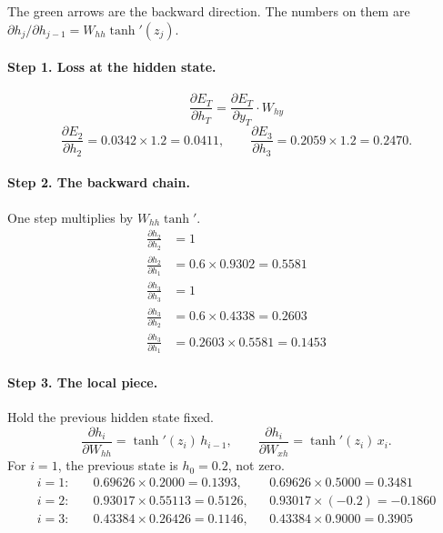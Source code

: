 \documentclass[11pt,a4paper]{article}
\begin{document}
\begin{center}
\end{center}

The green arrows are the backward direction. The numbers on them are \(\partial h_j/\partial h_{j-1}=W_{hh}\tanh'(z_j)\).

\paragraph{Step 1. Loss at the hidden state.}
\[
\frac{\partial E_T}{\partial h_T}=\frac{\partial E_T}{\partial y_T}\cdot W_{hy}
\]
\[
\frac{\partial E_2}{\partial h_2}=0.0342\times 1.2=0.0411,
\qquad
\frac{\partial E_3}{\partial h_3}=0.2059\times 1.2=0.2470.
\]

\paragraph{Step 2. The backward chain.} One step multiplies by \(W_{hh}\tanh'\).
\begin{align*}
\frac{\partial h_2}{\partial h_2}&=1\\
\frac{\partial h_2}{\partial h_1}&=0.6\times 0.9302=0.5581\\[0.3em]
\frac{\partial h_3}{\partial h_3}&=1\\
\frac{\partial h_3}{\partial h_2}&=0.6\times 0.4338=0.2603\\
\frac{\partial h_3}{\partial h_1}&=0.2603\times 0.5581=0.1453
\end{align*}

\paragraph{Step 3. The local piece.} Hold the previous hidden state fixed.
\[
\frac{\partial h_i}{\partial W_{hh}}=\tanh'(z_i)\,h_{i-1},
\qquad
\frac{\partial h_i}{\partial W_{xh}}=\tanh'(z_i)\,x_i.
\]
For \(i=1\), the previous state is \(h_0=0.2\), not zero.
\begin{align*}
i=1:&\quad 0.69626\times 0.2000=0.1393,
      && 0.69626\times 0.5000=0.3481\\
i=2:&\quad 0.93017\times 0.55113=0.5126,
      && 0.93017\times(-0.2)=-0.1860\\
i=3:&\quad 0.43384\times 0.26426=0.1146,
      && 0.43384\times 0.9000=0.3905
\end{align*}
\end{document}
